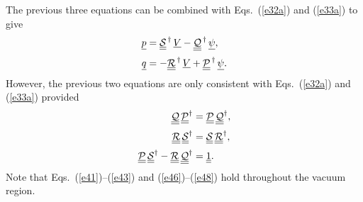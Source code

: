 \documentclass[12pt,prb,aps,notitlepage]{revtex4-1}
\begin{document}
The previous three equations can be combined with Eqs.~(\ref{e32a}) and (\ref{e33a}) to give 
\begin{align}
\underline{p} &= \underline{\underline{\cal S}}^{\,\dag} \,\underline{V} - \underline{\underline{\cal Q}}^{\,\dag}\,\underline{\psi},\\[0.5ex]
\underline{q} &= -\underline{\underline{\cal R}}^{\,\dag} \,\underline{V} + \underline{\underline{\cal P}}^{\,\dag}\,\underline{\psi}.
\end{align}
However, the previous two equations are only consistent with Eqs.~(\ref{e32a}) and (\ref{e33a}) provided 
\begin{align}\label{e46}
\underline{\underline{\cal Q}}\,\underline{\underline{\cal P}}^\dag&= \underline{\underline{\cal P}}\,\underline{\underline{\cal Q}}^\dag,\\[0.5ex]
\underline{\underline{\cal R}}\,\underline{\underline{\cal S}}^\dag&= \underline{\underline{\cal S}}\,\underline{\underline{\cal R}}^\dag,\label{e47}\\[0.5ex]
\underline{\underline{\cal P}}\,\underline{\underline{\cal S}}^{\dag}- \underline{\underline{\cal R}}\,\underline{\underline{\cal Q}}^{\dag}&=\underline{\underline{1}}.\label{e48}
\end{align}
Note that Eqs.~(\ref{e41})--(\ref{e43}) and (\ref{e46})--(\ref{e48}) hold throughout the vacuum region. 
\end{document}
